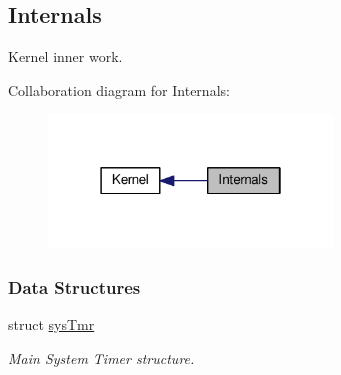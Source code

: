 \hypertarget{group__kern__impl}{\subsection{Internals}
\label{group__kern__impl}
}


Kernel inner work.  


Collaboration diagram for Internals\-:\nopagebreak
\begin{figure}[H]
\begin{center}
\leavevmode
\includegraphics[width=214pt]{group__kern__impl}
\end{center}
\end{figure}
\subsubsection*{Data Structures}
\begin{DoxyCompactItemize}
\item 
struct \hyperlink{structsysTmr}{sys\-Tmr}
\begin{DoxyCompactList}\small\item\em Main System Timer structure. \end{DoxyCompactList}\end{DoxyCompactItemize}
